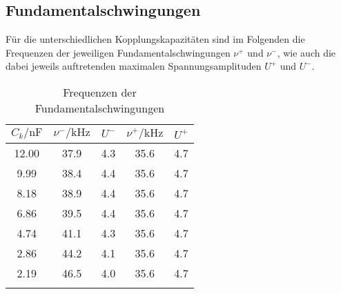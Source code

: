 \FloatBarrier
\subsection{Fundamentalschwingungen}
Für die unterschiedlichen Kopplungskapazitäten sind im Folgenden die Frequenzen der jeweiligen
Fundamentalschwingungen $\nu^+$ und $\nu^-$, wie auch die dabei jeweils auftretenden maximalen
Spannungsamplituden $U^+$ und $U^-$.
\begin{table}
    \centering
    \caption{Frequenzen der Fundamentalschwingungen}
    \begin{tabular}{c c c c c}
    \toprule
    {$C_k / \si{\nano\farad}$} & {$\nu^- / \si{\kilo\hertz}$} & {$U^-$} & {$\nu^+ / \si{\kilo\hertz}$} & {$U^+$} \\
    \midrule
    12.00 & 37.9 & 4.3 & 35.6 & 4.7 \\
     9.99 & 38.4 & 4.4 & 35.6 & 4.7 \\
     8.18 & 38.9 & 4.4 & 35.6 & 4.7 \\
     6.86 & 39.5 & 4.4 & 35.6 & 4.7 \\
     4.74 & 41.1 & 4.3 & 35.6 & 4.7 \\
     2.86 & 44.2 & 4.1 & 35.6 & 4.7 \\
     2.19 & 46.5 & 4.0 & 35.6 & 4.7 \\
     \bottomrule
     \label{tab:b}
    \end{tabular}
\end{table}

